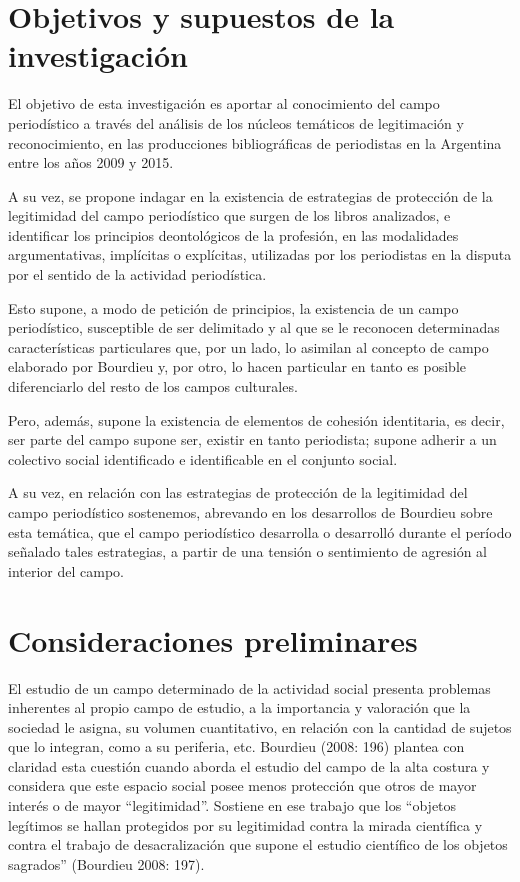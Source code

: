 \section {Objetivos y supuestos de la investigación}
El objetivo de esta investigación es aportar al conocimiento del campo periodístico a través del análisis de los núcleos temáticos de legitimación y reconocimiento, en las producciones bibliográficas de periodistas en la Argentina entre los años 2009 y 2015.

A su vez, se propone indagar en la existencia de estrategias de protección de la legitimidad del campo periodístico que surgen de los libros analizados, e identificar los principios deontológicos de la profesión, en las modalidades argumentativas, implícitas o explícitas, utilizadas por los periodistas en la disputa por el sentido de la actividad periodística.

Esto supone, a modo de petición de principios, la existencia de un campo periodístico, susceptible de ser delimitado y al que se le reconocen determinadas características particulares que, por un lado, lo asimilan al concepto de campo elaborado por Bourdieu y, por otro, lo hacen particular en tanto es posible diferenciarlo del resto de los campos culturales.

Pero, además, supone la existencia de elementos de cohesión identitaria, es decir, ser parte del campo supone ser, existir en tanto periodista; supone adherir a un colectivo social identificado e identificable en el conjunto social.

A su vez, en relación con las estrategias de protección de la legitimidad del campo periodístico sostenemos, abrevando en los desarrollos de Bourdieu sobre esta temática, que el campo periodístico desarrolla o desarrolló durante el período señalado tales estrategias, a partir de una tensión o sentimiento de agresión al interior del campo.

\section {Consideraciones preliminares}
El estudio de un campo determinado de la actividad social presenta problemas inherentes al propio campo de estudio, a la importancia y valoración que la sociedad le asigna, su volumen cuantitativo, en relación con la cantidad de sujetos que lo integran, como a su periferia, etc. Bourdieu (2008: 196) plantea con claridad esta cuestión cuando aborda el estudio del campo de la alta costura y considera que este espacio social posee menos protección que otros de mayor interés o de mayor ``legitimidad''. Sostiene en ese trabajo que los ``objetos legítimos se hallan protegidos por su legitimidad contra la mirada científica y contra el trabajo de desacralización que supone el estudio científico de los objetos sagrados'' (Bourdieu 2008: 197).

